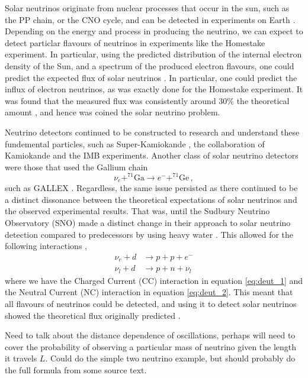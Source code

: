 Solar neutrinos originate from nuclear processes that occur in the sun, such as the PP chain, or the CNO cycle, and can be detected in experiments on Earth \cite{solar_nu}. Depending on the energy and process in producing the neutrino, we can expect to detect particlar flavours of neutrinos in experiments like the Homestake experiment. In particular, using the predicted distribution of the internal electron density of the Sun, and a spectrum of the produced electron flavours, one could predict the expected flux of solar neutrinos \cite{solar_nu}. In particular, one could predict the influx of electron neutrinos, as was exactly done for the Homestake experiment. It was found that the measured flux was consistently around 30\% the theoretical amount \cite{davis, bahcall, solar_nu}, and hence was coined the solar neutrino problem.

Neutrino detectors continued to be constructed to research and understand these fundemental particles, such as Super-Kamiokande \cite{superk}, the collaboration of Kamiokande \cite{kam} and the IMB \cite{imb} experiments. Another class of solar neutrino detectors were those that used the Gallium chain
\begin{equation}\label{eq:gal}
  \nu_{e} + ^{71}\text{Ga} \to e^{-} + ^{71}\text{Ge}\, ,
\end{equation}
such as GALLEX \cite{gallex}. Regardless, the same issue persisted as there continued to be a distinct dissonance between the theoretical expectations of solar neutrinos and the observed experimental results. That was, until the Sudbury Neutrino Observatory (SNO) made a distinct change in their approach to solar neutrino detection compared to predecessors by using heavy water \cite{sno}. This allowed for the following interactions \cite{sno},
\begin{align}
  \nu_{e} + d & \to p + p + e^{-} \label{eq:deut_1} \\
  \nu_{l} + d & \to p + n + \nu_{l} \label{eq:deut_2}
\end{align}
where we have the Charged Current (CC) interaction in equation \ref{eq:deut_1} and the Neutral Current (NC) interaction in equation \ref{eq:deut_2}. This meant that all flavours of neutrinos could be detected, and using it to detect solar neutrinos showed the theoretical flux originally predicted \cite{sno}. 

Need to talk about the distance dependence of oscillations, perhaps will need to cover the probability of observing a particular mass of neutrino given the length it travels $L$. Could do the simple two neutrino example, but should probably do the full formula from some source text.


